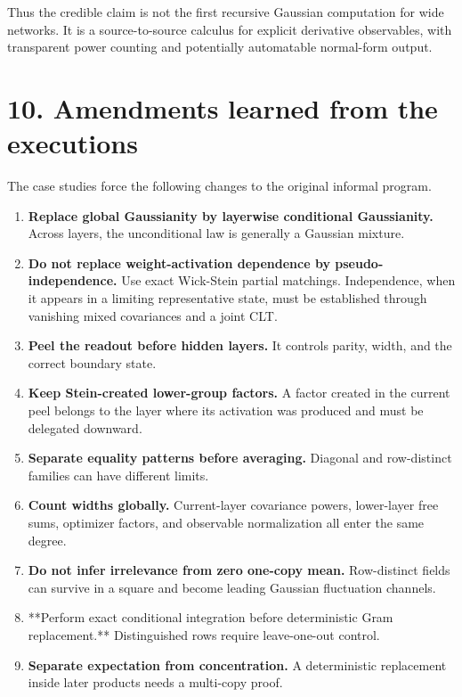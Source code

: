 Thus the credible claim is not the first recursive Gaussian computation for
wide networks. It is a source-to-source calculus for explicit derivative
observables, with transparent power counting and potentially automatable
normal-form output.

\section*{10. Amendments learned from the executions}


The case studies force the following changes to the original informal
program.

\begin{enumerate}
\item \textbf{Replace global Gaussianity by layerwise conditional Gaussianity.}
   Across layers, the unconditional law is generally a Gaussian mixture.
\item \textbf{Do not replace weight-activation dependence by pseudo-independence.}
   Use exact Wick-Stein partial matchings. Independence, when it appears in a
   limiting representative state, must be established through vanishing
   mixed covariances and a joint CLT.
\item \textbf{Peel the readout before hidden layers.} It controls parity, width, and
   the correct boundary state.
\item \textbf{Keep Stein-created lower-group factors.} A factor created in the
   current peel belongs to the layer where its activation was produced and
   must be delegated downward.
\item \textbf{Separate equality patterns before averaging.} Diagonal and
   row-distinct families can have different limits.
\item \textbf{Count widths globally.} Current-layer covariance powers, lower-layer
   free sums, optimizer factors, and observable normalization all enter the
   same degree.
\item \textbf{Do not infer irrelevance from zero one-copy mean.} Row-distinct fields
   can survive in a square and become leading Gaussian fluctuation channels.
\item **Perform exact conditional integration before deterministic Gram
   replacement.** Distinguished rows require leave-one-out control.
\item \textbf{Separate expectation from concentration.} A deterministic replacement
   inside later products needs a multi-copy proof.

\end{enumerate}
